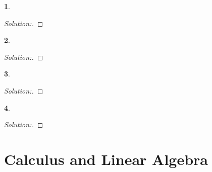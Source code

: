 \documentclass[10pt]{report}
\newtheorem{exe}{}[chapter]
\newenvironment{sol}{\begin{proof}[Solution:]}{\end{proof}}
\begin{document}
\begin{exe}

\end{exe}
\begin{teacher}
\begin{sol}
\end{sol}
\end{teacher}

\begin{exe}

\end{exe}
\begin{teacher}
\begin{sol}
\end{sol}
\end{teacher}

\begin{exe}

\end{exe}
\begin{teacher}
\begin{sol}
\end{sol}
\end{teacher}




































\begin{exe}

\end{exe}
\begin{teacher}
\begin{sol}
\end{sol}
\end{teacher}



\chapter{Calculus and Linear Algebra}
\end{document}
